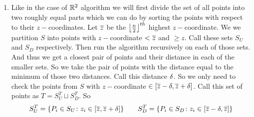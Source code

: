 \documentclass[a4paper, 11pt]{article}
\begin{document}
{\begin{enumerate}[label=(\alph*)]
	\begin{algorithm}
		\DontPrintSemicolon
\caption{}
	\end{algorithm}
In the algorithm instead od checking for a point with distance less than $\dl$ we are checking pair of points with distance less than or equal to $\dl$ this is because we don't have any pair of points in $S_1$ or $S_2$ which are at least $\dl$ distance. So if there is no pair of points in $S_1\cup S_2$ with distance less than $\dl$ we still get a pair of points with distance equal to $\dl$ and that pair points have the shortest distance.\parinf

\textbf{Time Complexity:} Here to sort the points in $S_1\cup S_2$ it takes $O(n\log n)$ time since there are total $2n$ points in $S_1\cup S_2$. Now the for loop runs for $2n$ iterations and in each iterations it is checking for constant number of points and for each point it is doing constant time operations. So each iteration of the loop takes $O(1)$ time and the for loop takes in total $2nO(1)=O(n)$ time. Hence the whole algorithm takes $O(n\log n)$ time.
\item Like in the case of $\mathbb{R}^2$ algorithm we will first divide the set of all points into two roughly equal parts which we can do by sorting the points with respect to their $z-$coordinates. Let $\overline{z}$ be the $\left\lfloor \frac{n}2\right\rfloor^{th}$ highest $z-$coordinate. We we partition $S$ into points with $z-$coordinate $< \overline{z}$ and $\geq z$. Call these sets $S_U$ and $S_D$ respectively. Then run the algorithm recursively on each of those sets. And thus we get a closest pair of points and their distance in each of the smaller sets. So we take the pair of points with the distance equal to  the minimum of those two distances. Call this distance $\dl$. So we only need to check the points from $S$ with $z-$coordinate $\in [\overline{z}-\delta,\overline{z}+\delta]$. Call this set of points as $T=S_U^T\sqcup S_D^T$. So $$S_U^T=\{P_i\in S_U\colon z_i\in [\overline{z},\overline{z}+\delta] \}\qquad S_D^T=\{P_i\in S_D\colon z_i\in [\overline{z}-\delta,\overline{z}]\}$$
\parinn


\end{enumerate}}
\end{document}
